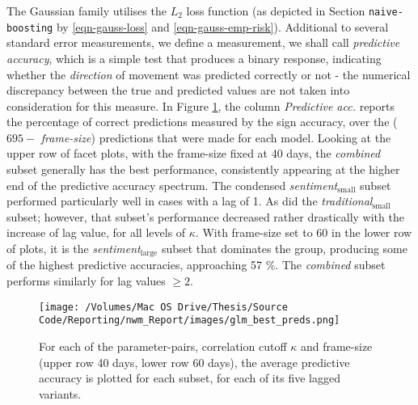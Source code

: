 \documentclass{article}
\begin{document}
The Gaussian family utilises the $L_2$ loss function (as depicted in Section \texttt{naive-boosting} by \eqref{eqn-gauss-loss} and \eqref{eqn-gauss-emp-risk}). Additional to several standard error measurements, we define a measurement, we shall call \emph{predictive accuracy}, which is a simple test that produces a binary response, indicating whether the \emph{direction} of movement was predicted correctly or not - the numerical discrepancy between the true and predicted values are not taken into consideration for this measure. In Figure \ref{fig:glm-pred-acc}, the column \emph{Predictive acc.} reports the percentage of correct predictions measured by the sign accuracy, over the ($695 -$ \emph{frame-size}) predictions that were made for each model.
Looking at the upper row of facet plots, with the frame-size fixed at 40 days, the \emph{combined} subset generally has the best performance, consistently appearing at the higher end of the predictive accuracy spectrum. The condensed \emph{sentiment$_{\text{small}}$} subset performed particularly well in cases with a lag of 1. As did the \emph{traditional$_{\text{small}}$} subset; however, that subset's performance decreased rather drastically with the increase of lag value, for all levels of $\kappa$.
With frame-size set to 60 in the lower row of plots, it is the \emph{sentiment$_{\text{large}}$} subset that dominates the group, producing some of the highest predictive accuracies, approaching 57 \%. The \emph{combined} subset performs similarly for lag values $\geqslant 2$. 

\begin{figure}[htb]
\centering
\texttt{[image: /Volumes/Mac OS Drive/Thesis/Source Code/Reporting/nwm\_Report/images/glm\_best\_preds.png]}
\caption[The predictive accuracy of all subsets, using Gaussian regression in GLMs]{\label{fig:glm-pred-acc}For each of the parameter-pairs, correlation cutoff $\kappa$ and frame-size (upper row 40 days, lower row 60 days), the average predictive accuracy is plotted for each subset, for each of its five lagged variants.}
\end{figure}
\end{document}
